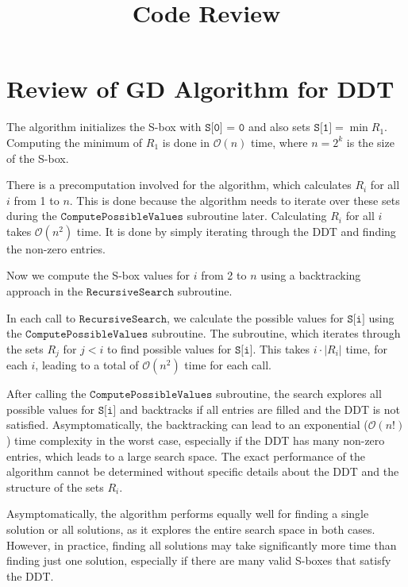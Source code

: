\documentclass{article}
\title{Code Review}
\author{}
\date{}
\begin{document}
\maketitle

\section{Review of GD Algorithm for DDT}

The algorithm initializes the S-box with $\texttt{S[0] = 0}$ and also sets $\texttt{S[1]} = \min R_1$.
Computing the minimum of $R_1$ is done in $\mathcal{O}(n)$ time, where $n = 2^k$ is the size of the S-box.

There is a precomputation involved for the algorithm, which calculates $R_i$ for all $i$ from 1 to $n$.
This is done because the algorithm needs to iterate over these sets during the $\texttt{ComputePossibleValues}$ subroutine later.
Calculating $R_i$ for all $i$ takes $\mathcal{O}(n^2)$ time.
It is done by simply iterating through the DDT and finding the non-zero entries.

Now we compute the S-box values for $i$ from 2 to $n$ using a backtracking approach in the $\texttt{RecursiveSearch}$ subroutine.

In each call to $\texttt{RecursiveSearch}$, we calculate the possible values for $\texttt{S[i]}$ using the $\texttt{ComputePossibleValues}$ subroutine.
The subroutine, which iterates through the sets $R_j$ for $j < i$ to find possible values for $\texttt{S[i]}$.
This takes $i \cdot |R_i|$ time, for each $i$, leading to a total of $\mathcal{O}(n^2)$ time for each call.

After calling the $\texttt{ComputePossibleValues}$ subroutine, the search explores all possible values for $\texttt{S[i]}$ and backtracks if all entries are filled and the DDT is not satisfied.
Asymptomatically, the backtracking can lead to an exponential ($\mathcal{O}(n!)$) time complexity in the worst case, especially if the DDT has many non-zero entries, which leads to a large search space.
The exact performance of the algorithm cannot be determined without specific details about the DDT and the structure of the sets $R_i$.

Asymptomatically, the algorithm performs equally well for finding a single solution or all solutions, as it explores the entire search space in both cases.
However, in practice, finding all solutions may take significantly more time than finding just one solution, especially if there are many valid S-boxes that satisfy the DDT.
\end{document}
